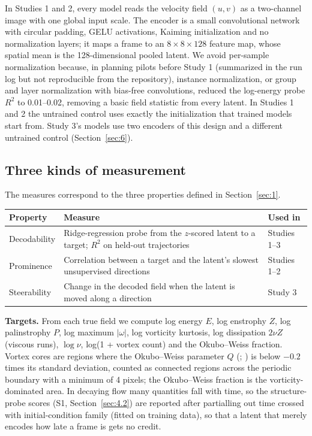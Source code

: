 \documentclass[10pt]{article}
\begin{document}
In Studies 1 and 2, every model reads the velocity field $(u, v)$ as a two-channel image with one global input scale. The encoder is a small convolutional network with circular padding, GELU activations, Kaiming initialization and no normalization layers; it maps a frame to an $8 \times 8 \times 128$ feature map, whose spatial mean is the 128-dimensional pooled latent. We avoid per-sample normalization because, in planning pilots before Study 1 (summarized in the run log but not reproducible from the repository), instance normalization, or group and layer normalization with bias-free convolutions, reduced the log-energy probe $R^2$ to 0.01--0.02, removing a basic field statistic from every latent. In Studies 1 and 2 the untrained control uses exactly the initialization that trained models start from. Study 3's models use two encoders of this design and a different untrained control (Section~\ref{sec:6}).

\subsection{Three kinds of measurement}\label{sec:3.3}

The measures correspond to the three properties defined in Section~\ref{sec:1}.

\begin{table}[htbp]
\centering
\small
\begin{tabularx}{\linewidth}{l>{\raggedright\arraybackslash}Xl}
\toprule
Property & Measure & Used in \\
\midrule
Decodability & Ridge-regression probe from the $z$-scored latent to a target; $R^2$ on held-out trajectories & Studies 1--3 \\
Prominence & Correlation between a target and the latent's slowest unsupervised directions & Studies 1--2 \\
Steerability & Change in the decoded field when the latent is moved along a direction & Study 3 \\
\bottomrule
\end{tabularx}
\end{table}

\textbf{Targets.} From each true field we compute log energy $E$, log enstrophy $Z$, log palinstrophy $P$, log maximum $|\omega|$, log vorticity kurtosis, log dissipation $2\nu Z$ (viscous runs), $\log\nu$, log(1 + vortex count) and the Okubo--Weiss fraction. Vortex cores are regions where the Okubo--Weiss parameter $Q$ (\citealp{okubo1970}; \citealp{weiss1991}) is below $-0.2$ times its standard deviation, counted as connected regions across the periodic boundary with a minimum of 4 pixels; the Okubo--Weiss fraction is the vorticity-dominated area. In decaying flow many quantities fall with time, so the structure-probe scores (S1, Section~\ref{sec:4.2}) are reported after partialling out time crossed with initial-condition family (fitted on training data), so that a latent that merely encodes how late a frame is gets no credit.
\end{document}
